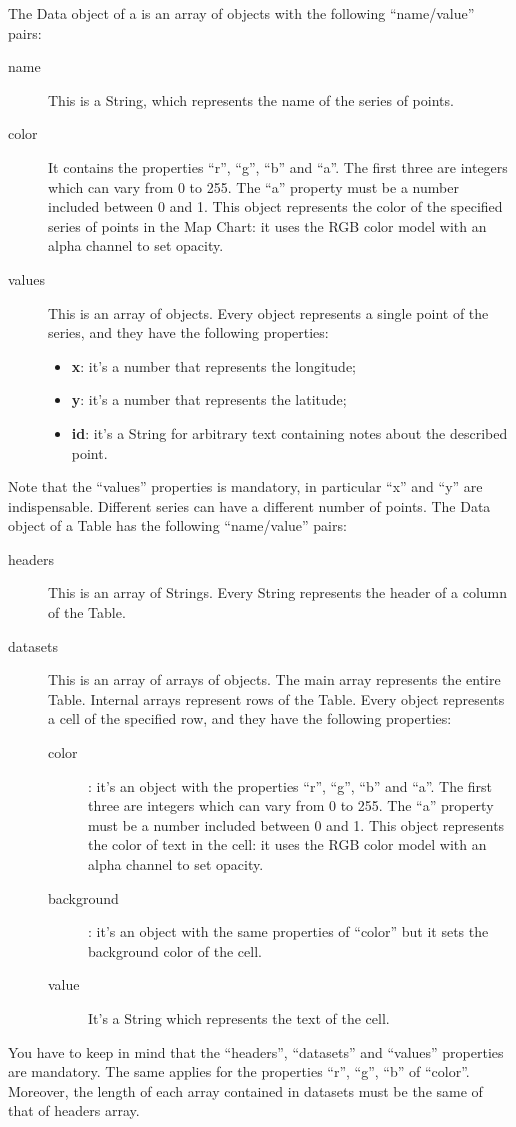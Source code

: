 			The Data object of a  is an array of objects with the following “name/value” pairs:
			\begin{description}
				\item[name] This is a String, which represents the name of the series of points.
				\item[color] It contains the properties “r”, “g”, “b” and “a”. The first three are integers which can vary from 0 to 255. The “a” property must be a number included between 0 and 1. This object represents the color of the specified series of points in the Map Chart: it uses the RGB color model with an alpha channel to set opacity.
				\item[values] This is an array of objects. Every object represents a single point of the series, and they have the following properties:
					\begin{itemize}
						\item \textbf{x}: it's a number that represents the longitude;
						\item \textbf{y}: it's a number that represents the latitude;
						\item \textbf{id}: it's a String for arbitrary text containing notes about the described point.
					\end{itemize}
			\end{description}
			Note that the “values” properties is mandatory, in particular “x” and “y” are indispensable. Different series can have a different number of points.
			The Data object of a Table has the following “name/value” pairs:
			\begin{description}
				\item[headers] This is an array of Strings. Every String represents the header of a column of the Table.
				\item[datasets] This is an array of arrays of objects. The main array represents the entire Table. Internal arrays represent rows of the Table. Every object represents a cell of the specified row, and they have the following properties:
				\begin{description}
					\item[color]: it's an object with the properties “r”, “g”, “b” and “a”. The first three are integers which can vary from 0 to 255. The “a” property must be a number included between 0 and 1.
					This object represents the color of text in the cell: it uses the RGB color model with an alpha channel to set opacity.
					\item[background]: it's an object with the same properties of “color” but it sets the background color of the cell.
					\item[value] It's a String which represents the text of the cell.
				\end{description}
			\end{description}
			You have to keep in mind that the “headers”, “datasets” and “values” properties are mandatory. The same applies for the properties “r”, “g”, “b” of “color”. Moreover, the length of each array contained in datasets must be the same of that of headers array.

